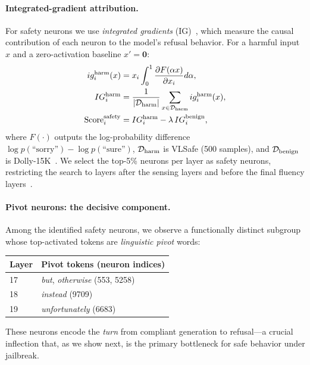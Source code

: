 \documentclass{article}
\begin{document}
\paragraph{Integrated-gradient attribution.}
For safety neurons we use \emph{integrated gradients}
(IG)~\citep{PLACEHOLDER_ig_verify}, which measure the causal
contribution of each neuron to the model's refusal behavior.
For a harmful input $x$ and a zero-activation baseline $x'=\mathbf{0}$:
\begin{align}
  ig_i^{\rm harm}(x) &= x_i \int_0^1
    \frac{\partial F(\alpha x)}{\partial x_i} d\alpha,
  \label{eq:ig}\\
  IG_i^{\rm harm} &= \frac{1}{|\mathcal{D}_{\rm harm}|}
    \sum_{x \in \mathcal{D}_{\rm harm}} ig_i^{\rm harm}(x),
  \label{eq:ig_avg}\\
  \mathrm{Score}_i^{\rm safety} &=
    IG_i^{\rm harm} - \lambda\, IG_i^{\rm benign},
  \label{eq:safety_score}
\end{align}
where $F(\cdot)$ outputs the log-probability difference
$\log p(\text{``sorry''}) - \log p(\text{``sure''})$,
$\mathcal{D}_{\rm harm}$ is VLSafe (500 samples),
and $\mathcal{D}_{\rm benign}$ is Dolly-15K~\citep{PLACEHOLDER_dolly_verify}.
We select the top-5\% neurons per layer as safety neurons,
restricting the search to layers after the sensing layers and
before the final fluency layers~\citep{PLACEHOLDER_hidden_states_verify}.

\paragraph{Pivot neurons: the decisive component.}
Among the identified safety neurons, we observe a functionally
distinct subgroup whose top-activated tokens are \emph{linguistic
pivot} words:

\begin{center}\small
\begin{tabular}{ll}
  \toprule
  Layer & Pivot tokens (neuron indices) \\
  \midrule
  17 & \emph{but}, \emph{otherwise} (553, 5258) \\
  18 & \emph{instead} (9709) \\
  19 & \emph{unfortunately} (6683) \\
  \bottomrule
\end{tabular}
\end{center}

\noindent
These neurons encode the \emph{turn} from compliant generation to
refusal---a crucial inflection that, as we show next, is the
primary bottleneck for safe behavior under jailbreak.
\end{document}
